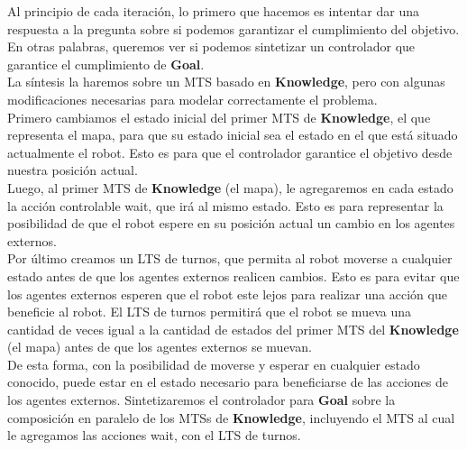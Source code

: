Al principio de cada iteración, lo primero que hacemos es intentar dar una respuesta a la pregunta sobre si podemos garantizar el cumplimiento del objetivo.
En otras palabras, queremos ver si podemos sintetizar un controlador que garantice el cumplimiento de \textbf{Goal}.\\
La síntesis la haremos sobre un MTS basado en \textbf{Knowledge}, pero con algunas modificaciones necesarias para modelar correctamente el problema.\\
Primero cambiamos el estado inicial del primer MTS de \textbf{Knowledge}, el que representa el mapa, para que su estado inicial sea el estado en el que está
situado actualmente el robot. Esto es para que el controlador garantice el objetivo desde nuestra posición actual.\\
Luego, al primer MTS de \textbf{Knowledge} (el mapa), le agregaremos en cada estado la acción controlable wait, que irá al mismo estado.
Esto es para representar la posibilidad de que el robot espere en su posición actual un cambio en los agentes externos.\\
Por último creamos un LTS de turnos, que permita al robot moverse a cualquier estado antes de que los agentes externos realicen cambios. Esto es para evitar que los
agentes externos esperen que el robot este lejos para realizar una acción que beneficie al robot. El LTS de turnos permitirá que el robot se mueva una cantidad
de veces igual a la cantidad de estados del primer MTS del \textbf{Knowledge} (el mapa) antes de que los agentes externos se muevan.\\
De esta forma, con la posibilidad de moverse y esperar en cualquier estado conocido, puede estar en el estado necesario para beneficiarse de las acciones de
los agentes externos. Sintetizaremos el controlador para \textbf{Goal} sobre la composición en paralelo de los MTSs de \textbf{Knowledge}, incluyendo el MTS al
cual le agregamos las acciones wait, con el LTS de turnos.

